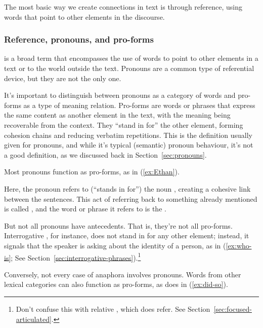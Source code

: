 The most basic way we create connections in text is through reference, using words that point to other elements in the discourse.

\subsubsection*{Reference, pronouns, and pro-forms}

 is a broad term that encompasses the use of words to point to other elements in a text or to the world outside the text. Pronouns are a common type of referential device, but they are not the only one.

It's important to distinguish between pronouns as a category of words and pro-forms as a type of meaning relation. Pro-forms are words or phrases that express the same content as another element in the text, with the meaning being recoverable from the context. They \enquote{stand in for} the other element, forming cohesion chains and reducing verbatim repetitions. This is the definition usually given for pronouns, and while it's typical (semantic) pronoun behaviour, it's not a good definition, as we discussed back in Section~\ref{sec:pronouns}.

Most pronouns function as pro-forms, as in (\ref{ex:Ethan}).

 \label{ex:Ethan}
\z
Here, the pronoun  refers to (\enquote{stands in for}) the noun , creating a cohesive link between the sentences. This act of referring back to something already mentioned is called , and the word or phrase it refers to is the .

But not all pronouns have antecedents. That is, they're not all pro-forms. Interrogative , for instance, does not stand in for any other element; instead, it signals that the speaker is asking about the identity of a person, as in (\ref{ex:who-is}; See Section~\ref{sec:interrogative-phrases}).\footnote{Don't confuse this with relative , which does refer. See Section~\ref{sec:focused-articulated}.}

\label{ex:who-is}
\z
Conversely, not every case of anaphora involves pronouns. Words from other lexical categories can also function as pro-forms, as  does in (\ref{ex:did-so}).


